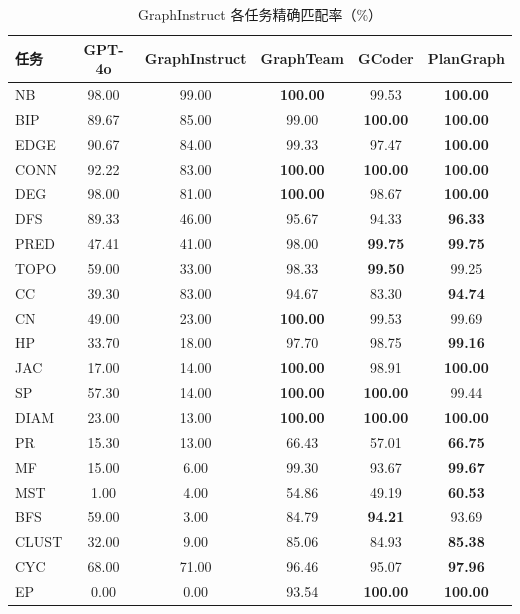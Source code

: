 \begin{table}[H]
\centering
\small
\caption{GraphInstruct 各任务精确匹配率（\%）}
\label{tab:appendix_graphinstruct}
\begin{tabular}{lccccc}
\toprule
任务 & GPT-4o & GraphInstruct & GraphTeam & GCoder & PlanGraph \\
\midrule
NB & 98.00 & 99.00 & \textbf{100.00} & 99.53 & \textbf{100.00} \\
BIP & 89.67 & 85.00 & 99.00 & \textbf{100.00} & \textbf{100.00} \\
EDGE & 90.67 & 84.00 & 99.33 & 97.47 & \textbf{100.00} \\
CONN & 92.22 & 83.00 & \textbf{100.00} & \textbf{100.00} & \textbf{100.00} \\
DEG & 98.00 & 81.00 & \textbf{100.00} & 98.67 & \textbf{100.00} \\
DFS & 89.33 & 46.00 & 95.67 & 94.33 & \textbf{96.33} \\
PRED & 47.41 & 41.00 & 98.00 & \textbf{99.75} & \textbf{99.75} \\
TOPO & 59.00 & 33.00 & 98.33 & \textbf{99.50} & 99.25 \\
CC & 39.30 & 83.00 & 94.67 & 83.30 & \textbf{94.74} \\
CN & 49.00 & 23.00 & \textbf{100.00} & 99.53 & 99.69 \\
HP & 33.70 & 18.00 & 97.70 & 98.75 & \textbf{99.16} \\
JAC & 17.00 & 14.00 & \textbf{100.00} & 98.91 & \textbf{100.00} \\
SP & 57.30 & 14.00 & \textbf{100.00} & \textbf{100.00} & 99.44 \\
DIAM & 23.00 & 13.00 & \textbf{100.00} & \textbf{100.00} & \textbf{100.00} \\
PR & 15.30 & 13.00 & 66.43 & 57.01 & \textbf{66.75} \\
MF & 15.00 & 6.00 & 99.30 & 93.67 & \textbf{99.67} \\
MST & 1.00 & 4.00 & 54.86 & 49.19 & \textbf{60.53} \\
BFS & 59.00 & 3.00 & 84.79 & \textbf{94.21} & 93.69 \\
CLUST & 32.00 & 9.00 & 85.06 & 84.93 & \textbf{85.38} \\
CYC & 68.00 & 71.00 & 96.46 & 95.07 & \textbf{97.96} \\
EP & 0.00 & 0.00 & 93.54 & \textbf{100.00} & \textbf{100.00} \\
\bottomrule
\end{tabular}
\end{table}

